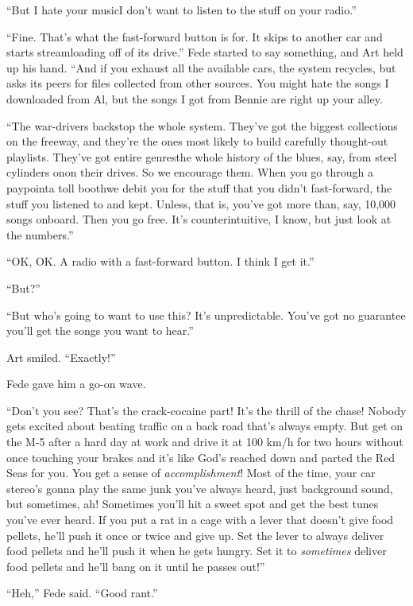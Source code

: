 “But I hate your music{\dash}I don’t want to listen to the stuff on your
radio.”

“Fine. That’s what the fast-forward button is for. It skips to
another car and starts streamloading off of its drive.” Fede
started to say something, and Art held up his hand. “And if you
exhaust all the available cars, the system recycles, but asks its
peers for files collected from other sources. You might hate the
songs I downloaded from Al, but the songs I got from Bennie are
right up your alley.

“The war-drivers backstop the whole system. They’ve got the biggest
collections on the freeway, and they’re the ones most likely to
build carefully thought-out playlists. They’ve got entire
genres{\dash}the whole history of the blues, say, from steel cylinders
on{\dash}on their drives. So we encourage them. When you go through a
paypoint{\dash}a toll booth{\dash}we debit you for the stuff that you didn’t
fast-forward, the stuff you listened to and kept. Unless, that is,
you’ve got more than, say, 10,000 songs onboard. Then you go free.
It’s counterintuitive, I know, but just look at the numbers.”

“OK, OK. A radio with a fast-forward button. I think I get it.”

“But?”

“But who’s going to want to use this? It’s unpredictable. You’ve
got no guarantee you’ll get the songs you want to hear.”

Art smiled. “Exactly!”

Fede gave him a go-on wave.

“Don’t you see? That’s the crack-cocaine part! It’s the thrill of
the chase! Nobody gets excited about beating traffic on a back road
that’s always empty. But get on the M-5 after a hard day at work
and drive it at 100 km/h for two hours without once touching your
brakes and it’s like God’s reached down and parted the Red Seas for
you. You get a sense of \emph{accomplishment}! Most of the time,
your car stereo’s gonna play the same junk you’ve always heard,
just background sound, but sometimes, ah! Sometimes you’ll hit a
sweet spot and get the best tunes you’ve ever heard. If you put a
rat in a cage with a lever that doesn’t give food pellets, he’ll
push it once or twice and give up. Set the lever to always deliver
food pellets and he’ll push it when he gets hungry. Set it to
\emph{sometimes} deliver food pellets and he’ll bang on it until he
passes out!”

“Heh,” Fede said. “Good rant.”

